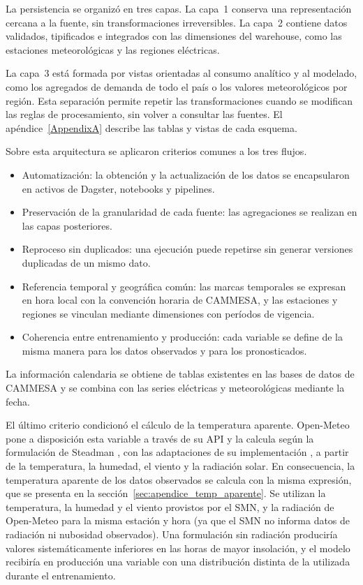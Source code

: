 La persistencia se organizó en tres capas. La capa~1 conserva una representación cercana a la fuente, sin transformaciones irreversibles. La capa~2 contiene datos validados, tipificados e integrados con las dimensiones del warehouse, como las estaciones meteorológicas y las regiones eléctricas. 

La capa~3 está formada por vistas orientadas al consumo analítico y al modelado, como los agregados de demanda de todo el país o los valores meteorológicos por región. Esta separación permite repetir las transformaciones cuando se modifican las reglas de procesamiento, sin volver a consultar las fuentes. El apéndice~\ref{AppendixA} describe las tablas y vistas de cada esquema.

Sobre esta arquitectura se aplicaron criterios comunes a los tres flujos. 

\begin{itemize}
	\item Automatización: la obtención y la actualización de los datos se encapsularon en activos de Dagster, notebooks y pipelines.
	
	\item Preservación de la granularidad de cada fuente: las agregaciones se realizan en las capas posteriores.
	
	\item Reproceso sin duplicados: una ejecución puede repetirse sin generar versiones duplicadas de un mismo dato.
	
	\item Referencia temporal y geográfica común: las marcas temporales se expresan en hora local con la convención horaria de CAMMESA, y las estaciones y regiones se vinculan mediante dimensiones con períodos de vigencia.
	
	\item Coherencia entre entrenamiento y producción: cada variable se define de la misma manera para los datos observados y para los pronosticados.
\end{itemize}

La información calendaria se obtiene de tablas existentes en las bases de datos de CAMMESA y se combina con las series eléctricas y meteorológicas mediante la fecha.

El último criterio condicionó el cálculo de la temperatura aparente. Open-Meteo pone a disposición esta variable a través de su API y la calcula según la formulación de Steadman \cite{steadman1994apparent}, con las adaptaciones de su implementación \cite{openMeteoCodigo}, a partir de la temperatura, la humedad, el viento y la radiación solar. En consecuencia, la temperatura aparente de los datos observados se calcula con la misma expresión, que se presenta en la sección~\ref{sec:apendice_temp_aparente}. Se utilizan la temperatura, la humedad y el viento provistos por el SMN, y la radiación de Open-Meteo para la misma estación y hora (ya que el SMN no informa datos de radiación ni nubosidad observados). Una formulación sin radiación produciría valores sistemáticamente inferiores en las horas de mayor insolación, y el modelo recibiría en producción una variable con una distribución distinta de la utilizada durante el entrenamiento.

